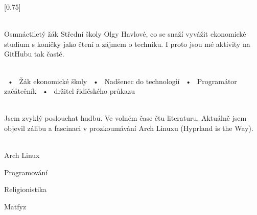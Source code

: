 \documentclass[verylight]{simplehipstercv}
\begin{document}
\setlength{\columnsep}{1.5cm}
[0.75]
\begin{paracol}{2}

\paracolbackgroundoptions



\footnotesize
{\setasidefontcolour
\flushright
{} %

\\[0.5em]

{\footnotesize
Osmnáctiletý žák Střední školy Olgy Havlové, co se snaží vyvážit ekonomické studium s koníčky jako čtení a zájmem o techniku. I proto jsou mé aktivity na GitHubu tak časté.} \\
\bigskip

 \\[0.5em]

~•~ Žák ekonomické školy ~•~ Nadšenec do technologií ~•~ Programátor začátečník ~•~ držitel řidičského průkazu

\bigskip



\bigskip

\\[0.5em]

Jsem zvyklý poslouchat hudbu.
Ve volném čase čtu literaturu.
Aktuálně jsem objevil zálibu a fascinaci v prozkoumávání Arch Linuxu (Hyprland is the Way). \\
\bigskip

\\[0.5em]

{Arch Linux}

{Programování}

{Religionistika}

{Matfyz}

\vspace{4em}

 \\
\vspace{14em}

}
\end{paracol}
\end{document}
